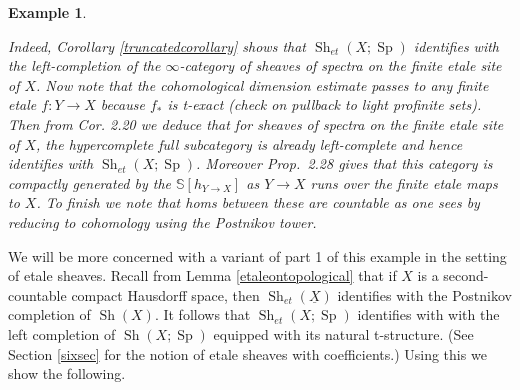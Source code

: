 \documentclass[12pt]{article}
\newtheorem{example}[theorem]{Example}
\newcommand{\on}{\operatorname}
\newcommand{\mbb}{\mathbb}
\begin{document}
\begin{example}
\begin{enumerate}
Indeed, Corollary \ref{truncatedcorollary} shows that $\on{Sh}_{et}(X;\on{Sp})$ identifies with the left-completion of the $\infty$-category of sheaves of spectra on the finite etale site of $X$.  Now note that the cohomological dimension estimate passes to any finite etale $f:Y\to X$ because $f_\ast$ is t-exact (check on pullback to light profinite sets).  Then from \cite{ClausenHyper} Cor. 2.20 we deduce that for sheaves of spectra on the finite etale site of $X$, the hypercomplete full subcategory is already left-complete and hence identifies with $\on{Sh}_{et}(X;\on{Sp})$.   Moreover \cite{ClausenHyper} Prop.\ 2.28 gives that this category is compactly generated by the $\mbb{S}[h_{Y\to X}]$ as $Y\to X$ runs over the finite etale maps to $X$.  To finish we note that homs between these are countable as one sees by reducing to cohomology using the Postnikov tower.
\end{enumerate}
\end{example}

We will be more concerned with a variant of part 1 of this example in the setting of etale sheaves.  Recall from Lemma \ref{etaleontopological} that if $X$ is a second-countable compact Hausdorff space, then $\on{Sh}_{et}(\underline{X})$ identifies with the Postnikov completion of $\on{Sh}(X)$.  It follows that $\on{Sh}_{et}(X;\on{Sp})$ identifies with with the left completion of $\on{Sh}(X;\on{Sp})$ equipped with its natural t-structure.  (See Section \ref{sixsec} for the notion of etale sheaves with coefficients.)  Using this we show the following.
\end{document}
